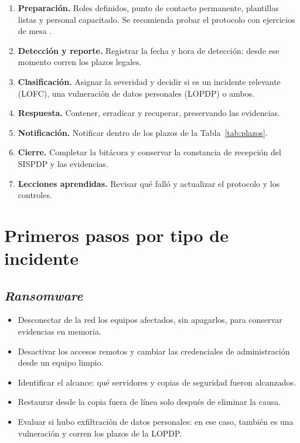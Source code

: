 \documentclass[11pt,a4paper,oneside]{report}
\begin{document}
\begin{enumerate}[leftmargin=*]
  \item \textbf{Preparación.} Roles definidos, punto de contacto permanente, plantillas listas y personal capacitado. Se recomienda probar el protocolo con ejercicios de mesa \cite{nist80084}.
  \item \textbf{Detección y reporte.} Registrar la fecha y hora de detección: desde ese momento corren los plazos legales.
  \item \textbf{Clasificación.} Asignar la severidad y decidir si es un incidente relevante (LOFC), una vulneración de datos personales (LOPDP) o ambos.
  \item \textbf{Respuesta.} Contener, erradicar y recuperar, preservando las evidencias.
  \item \textbf{Notificación.} Notificar dentro de los plazos de la Tabla~\ref{tab:plazos}.
  \item \textbf{Cierre.} Completar la bitácora y conservar la constancia de recepción del SISPDP y las evidencias.
  \item \textbf{Lecciones aprendidas.} Revisar qué falló y actualizar el protocolo y los controles.
\end{enumerate}

\section{Primeros pasos por tipo de incidente}
\subsection{\textit{Ransomware}}
\begin{itemize}[leftmargin=*]
  \item Desconectar de la red los equipos afectados, sin apagarlos, para conservar evidencias en memoria.
  \item Desactivar los accesos remotos y cambiar las credenciales de administración desde un equipo limpio.
  \item Identificar el alcance: qué servidores y copias de seguridad fueron alcanzados.
  \item Restaurar desde la copia fuera de línea solo después de eliminar la causa.
  \item Evaluar si hubo exfiltración de datos personales: en ese caso, también es una vulneración y corren los plazos de la LOPDP.
\end{itemize}
\end{document}
